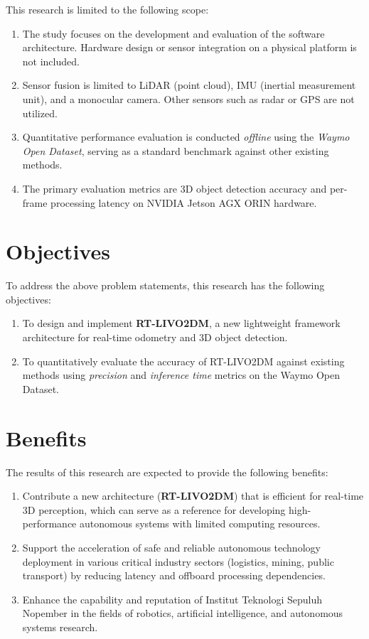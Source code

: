 This research is limited to the following scope:
\begin{enumerate}[nolistsep]
    \item The study focuses on the development and evaluation of the software architecture. Hardware design or sensor integration on a physical platform is not included.
    \item Sensor fusion is limited to LiDAR (point cloud), IMU (inertial measurement unit), and a monocular camera. Other sensors such as radar or GPS are not utilized.
    \item Quantitative performance evaluation is conducted \emph{offline} using the \emph{Waymo Open Dataset}, serving as a standard benchmark against other existing methods.
    \item The primary evaluation metrics are 3D object detection accuracy and per-frame processing latency on NVIDIA Jetson AGX ORIN hardware.
\end{enumerate}

\section{Objectives}
To address the above problem statements, this research has the following objectives:

\begin{enumerate}[nolistsep]
    \item To design and implement \textbf{RT-LIVO2DM}, a new lightweight framework architecture for real-time odometry and 3D object detection.
    \item To quantitatively evaluate the accuracy of RT-LIVO2DM against existing methods using \emph{precision} and \emph{inference time} metrics on the Waymo Open Dataset.
\end{enumerate}

\section{Benefits}
The results of this research are expected to provide the following benefits:
\begin{enumerate}
    \item Contribute a new architecture (\textbf{RT-LIVO2DM}) that is efficient for real-time 3D perception, which can serve as a reference for developing high-performance autonomous systems with limited computing resources.
    \item Support the acceleration of safe and reliable autonomous technology deployment in various critical industry sectors (logistics, mining, public transport) by reducing latency and offboard processing dependencies.
    \item Enhance the capability and reputation of Institut Teknologi Sepuluh Nopember in the fields of robotics, artificial intelligence, and autonomous systems research.
\end{enumerate}
